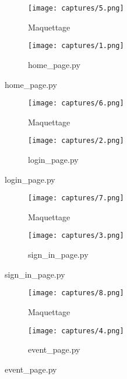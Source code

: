 \documentclass[11pt]{beamer}
\begin{document}
\begin{frame}
\begin{figure}[H]
    \centering
    \begin{subfigure}{0.45\textwidth}
        \texttt{[image: captures/5.png]}
        \caption{Maquettage}
    \end{subfigure}
    \vfill
    \begin{subfigure}{0.45\textwidth}
        \texttt{[image: captures/1.png]}
        \caption{home\_page.py}
    \end{subfigure}
\end{figure}
\end{frame}
\begin{frame}
\begin{figure}[H]
    \centering
    \begin{subfigure}{0.45\textwidth}
        \texttt{[image: captures/6.png]}
        \caption{Maquettage}
    \end{subfigure}
    \vfill
    \begin{subfigure}{0.45\textwidth}
        \texttt{[image: captures/2.png]}
        \caption{login\_page.py}
    \end{subfigure}
\end{figure}
\end{frame}
\begin{frame}
\begin{figure}[H]
    \centering
    \begin{subfigure}{0.45\textwidth}
        \texttt{[image: captures/7.png]}
        \caption{Maquettage}
    \end{subfigure}
    \vfill
    \begin{subfigure}{0.45\textwidth}
        \texttt{[image: captures/3.png]}
        \caption{sign\_in\_page.py}
    \end{subfigure}
\end{figure}
\end{frame}
\begin{frame}
\begin{figure}[H]
    \centering
    \begin{subfigure}{0.45\textwidth}
        \texttt{[image: captures/8.png]}
        \caption{Maquettage}
    \end{subfigure}
    \vfill
    \begin{subfigure}{0.45\textwidth}
        \texttt{[image: captures/4.png]}
        \caption{event\_page.py}
    \end{subfigure}
\end{figure}
\end{frame}
\end{document}
